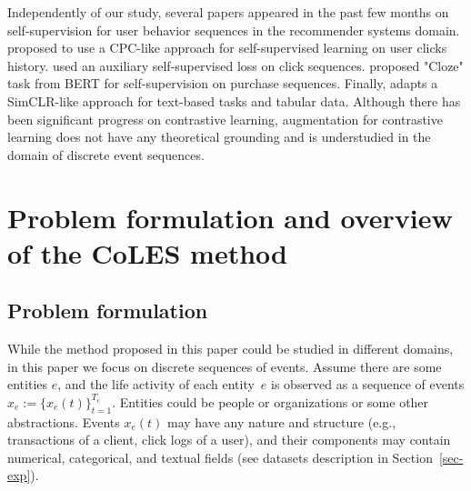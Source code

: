 \documentclass{article}
\newcommand{\R}{\mathbb{R}}
\begin{document}
Independently of our study, several papers appeared in the past few months on self-supervision for user behavior sequences in the recommender systems domain. \cite{Zhou2020ContrastiveLF} proposed to use a CPC-like approach for self-supervised learning on user clicks history. \cite{Ma2020DisentangledSI} used an auxiliary self-supervised loss on click sequences. \cite{Zhou2020S3RecSL} proposed "Cloze" task from BERT \citep{Devlin2019BERTPO} for self-supervision on purchase sequences. Finally, \cite{Yao2020SelfsupervisedLF} adapts a SimCLR-like approach for text-based tasks and tabular data. Although there has been significant progress on contrastive learning, augmentation for contrastive learning does not have any theoretical grounding and is understudied in the domain of discrete event sequences.


\section{Problem formulation and overview of the CoLES method} \label{sec-method}

\subsection{Problem formulation} \label{sec:problem setting}

While the method proposed in this paper could be studied in different domains, in this paper we focus on discrete sequences of events. Assume there are some entities $e$, and the life activity of each entity~$e$ is observed as a sequence of events $x_e:=\{x_e(t)\}^{T_e}_{t=1}$. Entities could be people or organizations or some other abstractions. Events $x_e(t)$ may have any nature and structure (e.g., transactions of a client, click logs of a user), and their components may contain numerical, categorical, and textual fields (see datasets description in Section~\ref{sec-exp}). 
\end{document}
